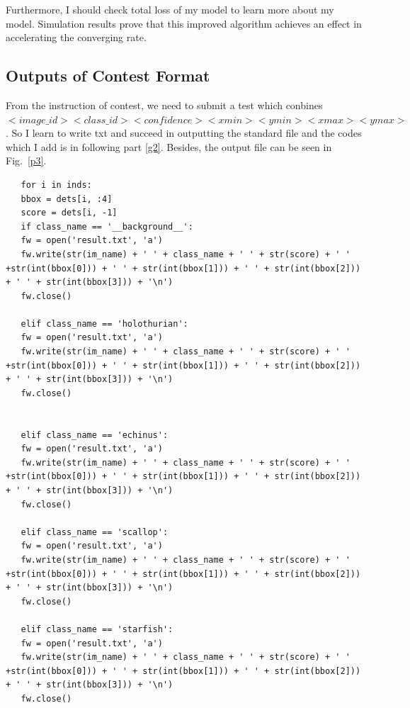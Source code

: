 \documentclass[a4paper]{article}
\begin{document}
Furthermore, I should check total loss of my model to learn more about my model. Simulation results prove that this improved algorithm achieves an effect in accelerating the converging rate.

\subsection{Outputs of Contest Format}

From the instruction of contest, we need to submit a test which conbines $<image\_id> <class\_id> <confidence> <xmin> <ymin> <xmax> <ymax>$. So I learn to write txt and succeed in outputting the standard file and the codes which I add is in following part \ref{g2}. Besides, the output file can be seen in Fig.~\ref{p3}.
\lstset{language=python}
\begin{lstlisting}
   for i in inds:
   bbox = dets[i, :4]
   score = dets[i, -1]
   if class_name == '__background__':
   fw = open('result.txt', 'a')  
   fw.write(str(im_name) + ' ' + class_name + ' ' + str(score) + ' ' +str(int(bbox[0])) + ' ' + str(int(bbox[1])) + ' ' + str(int(bbox[2])) + ' ' + str(int(bbox[3])) + '\n')
   fw.close()
   
   elif class_name == 'holothurian':
   fw = open('result.txt', 'a')  
   fw.write(str(im_name) + ' ' + class_name + ' ' + str(score) + ' ' +str(int(bbox[0])) + ' ' + str(int(bbox[1])) + ' ' + str(int(bbox[2])) + ' ' + str(int(bbox[3])) + '\n')
   fw.close()
   
   
   elif class_name == 'echinus':
   fw = open('result.txt', 'a')  
   fw.write(str(im_name) + ' ' + class_name + ' ' + str(score) + ' ' +str(int(bbox[0])) + ' ' + str(int(bbox[1])) + ' ' + str(int(bbox[2])) + ' ' + str(int(bbox[3])) + '\n')
   fw.close()
   
   elif class_name == 'scallop':
   fw = open('result.txt', 'a') 
   fw.write(str(im_name) + ' ' + class_name + ' ' + str(score) + ' ' +str(int(bbox[0])) + ' ' + str(int(bbox[1])) + ' ' + str(int(bbox[2])) + ' ' + str(int(bbox[3])) + '\n')
   fw.close()
   
   elif class_name == 'starfish':
   fw = open('result.txt', 'a')  
   fw.write(str(im_name) + ' ' + class_name + ' ' + str(score) + ' ' +str(int(bbox[0])) + ' ' + str(int(bbox[1])) + ' ' + str(int(bbox[2])) + ' ' + str(int(bbox[3])) + '\n')
   fw.close()
\end{lstlisting}\label{g2}
\end{document}
